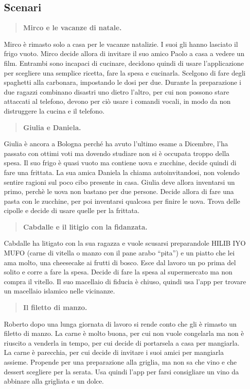 \subsection{Scenari}
\begin{quote}
	\textbf{Mirco e le vacanze di natale.}
\end{quote}
 Mirco è rimasto solo a casa per le vacanze natalizie. I suoi gli hanno lasciato il frigo vuoto. Mirco decide allora di invitare il suo amico Paolo a casa a vedere un film. Entrambi sono incapaci di cucinare, decidono quindi di usare l’applicazione per scegliere una semplice ricetta, fare la spesa e cucinarla. Scelgono di fare degli spaghetti alla carbonara, impostando le dosi per due. Durante la preparazione i due ragazzi combinano disastri uno dietro l’altro, per cui non possono stare attaccati al telefono, devono per ciò usare i comandi vocali, in modo da non distruggere la cucina e il telefono.
\begin{quote}
	\textbf{Giulia e Daniela.}
\end{quote}
Giulia è ancora a Bologna perché ha avuto l’ultimo esame a Dicembre, l’ha passato con ottimi voti ma dovendo studiare non si è occupata troppo della spesa. Il suo frigo è quasi vuoto ma contiene uova e zucchine, decide quindi di fare una frittata. La sua amica Daniela la chiama autoinvitandosi, non volendo sentire ragioni sul poco cibo presente in casa. Giulia deve allora inventarsi un primo, perchè le uova non bastano per due persone. Decide allora di fare una pasta con le zucchine, per poi inventarsi qualcosa per finire le uova. Trova delle cipolle e decide di usare quelle per la frittata.
\begin{quote}
	\textbf{Cabdalle e il litigio con la fidanzata.}
\end{quote}
Cabdalle ha litigato con la sua ragazza e vuole scusarsi preparandole HILIB IYO MUFO (carne di vitella o manzo con il pane arabo “pita”) e un piatto che lei ama molto, una cheesecake ai frutti di bosco. Esce dal lavoro un po prima del solito e corre a fare la spesa. Decide di fare la spesa al supermercato ma non compra il vitello. Il suo macellaio di fiducia è chiuso, quindi usa l’app per trovare un macellaio islamico nelle vicinanze. 
\begin{quote}
	\textbf{Il filetto di manzo.}
\end{quote}
Roberto dopo una lunga giornata di lavoro si rende conto che gli è rimasto un filetto di manzo. La carne è molto buona, per cui non vuole congelarla ma non è riuscito a venderla in tempo, per cui decide di portarsela a casa per mangiarla.  La carne è parecchia, per cui decide di invitare i suoi amici per mangiarla assieme. Propende per una preparazione alla griglia, ma non sa che vino e che dessert scegliere per la serata. Usa quindi l’app per farsi consigliare un vino da abbinare alla grigliata e un dolce.
